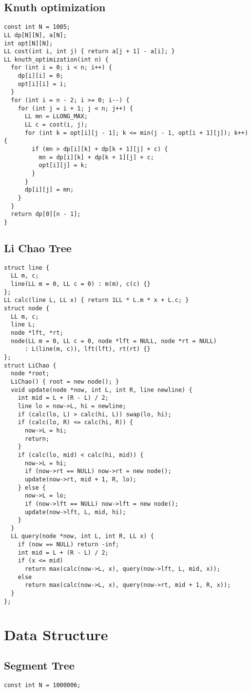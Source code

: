 \documentclass[FSZ,a4paper,onesided]{article}
\begin{document}
\begin{multicols*}{\COLS}
\subsection{Knuth optimization}
\begin{lstlisting}
const int N = 1005;
LL dp[N][N], a[N];
int opt[N][N];
LL cost(int i, int j) { return a[j + 1] - a[i]; }
LL knuth_optimization(int n) {
  for (int i = 0; i < n; i++) {
    dp[i][i] = 0;
    opt[i][i] = i;
  }
  for (int i = n - 2; i >= 0; i--) {
    for (int j = i + 1; j < n; j++) {
      LL mn = LLONG_MAX;
      LL c = cost(i, j);
      for (int k = opt[i][j - 1]; k <= min(j - 1, opt[i + 1][j]); k++) {
        if (mn > dp[i][k] + dp[k + 1][j] + c) {
          mn = dp[i][k] + dp[k + 1][j] + c;
          opt[i][j] = k;
        }
      }
      dp[i][j] = mn;
    }
  }
  return dp[0][n - 1];
}
\end{lstlisting}
\subsection{Li Chao Tree}
\begin{lstlisting}
struct line {
  LL m, c;
  line(LL m = 0, LL c = 0) : m(m), c(c) {}
};
LL calc(line L, LL x) { return 1LL * L.m * x + L.c; }
struct node {
  LL m, c;
  line L;
  node *lft, *rt;
  node(LL m = 0, LL c = 0, node *lft = NULL, node *rt = NULL)
      : L(line(m, c)), lft(lft), rt(rt) {}
};
struct LiChao {
  node *root;
  LiChao() { root = new node(); }
  void update(node *now, int L, int R, line newline) {
    int mid = L + (R - L) / 2;
    line lo = now->L, hi = newline;
    if (calc(lo, L) > calc(hi, L)) swap(lo, hi);
    if (calc(lo, R) <= calc(hi, R)) {
      now->L = hi;
      return;
    }
    if (calc(lo, mid) < calc(hi, mid)) {
      now->L = hi;
      if (now->rt == NULL) now->rt = new node();
      update(now->rt, mid + 1, R, lo);
    } else {
      now->L = lo;
      if (now->lft == NULL) now->lft = new node();
      update(now->lft, L, mid, hi);
    }
  }
  LL query(node *now, int L, int R, LL x) {
    if (now == NULL) return -inf;
    int mid = L + (R - L) / 2;
    if (x <= mid)
      return max(calc(now->L, x), query(now->lft, L, mid, x));
    else
      return max(calc(now->L, x), query(now->rt, mid + 1, R, x));
  }
};
\end{lstlisting}
\section{Data Structure}
\subsection{Segment Tree}
\begin{lstlisting}
const int N = 1000006;


\end{lstlisting}
\end{multicols*}
\end{document}
